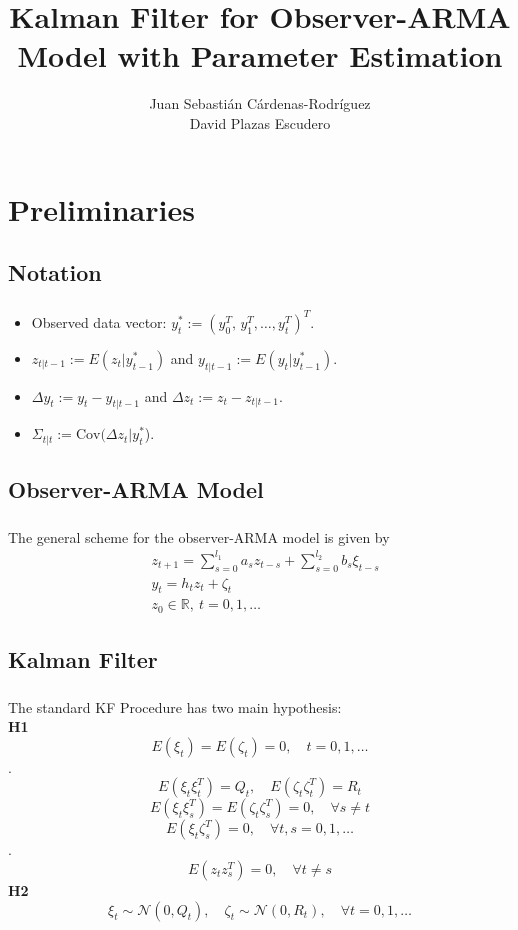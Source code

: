 \documentclass{beamer}
\title{Kalman Filter for Observer-ARMA Model with Parameter Estimation}
\author{Juan Sebasti\'an C\'ardenas-Rodríguez \\ David Plazas Escudero  \\ \vspace{0.5cm} \scalebox{0.7}{Mathematical Engineering, Universidad EAFIT}}
\theoremstyle{definition}
\theoremstyle{remark}
\theoremstyle{example}
\newif\ifinsection
\newif\ifinsubsection
\let\oldsection\section
\renewcommand{\section}{%
  \global\insectiontrue%
  \global\insubsectionfalse%
  \oldsection}
\let\oldsubsection\subsection
\renewcommand{\subsection}{%
  \global\insubsectiontrue%
  \oldsubsection}
\newcommand {\aframe}[1] {%
  \begin{frame}
    \ifinsection\frametitle{\secname}\fi
    \ifinsubsection\framesubtitle{\subsecname}\fi
  #1
  \end{frame}
}
\begin{document}
\begin{frame}[plain]
  \titlepage
\end{frame}

\section{Preliminaries}
\subsection{Notation}
\aframe{
\begin{itemize}
  \item Observed data vector: $y^*_t:=(y_0^T,\,y_1^T,\dots,y_t^T)^T$.
  \item $z_{t|t-1}:=E(z_t|y^*_{t-1})$ and $y_{t|t-1}:=E(y_t|y^*_{t-1})$.
  \item $\Delta y_t:=y_t-y_{t|t-1}$ and $\Delta z_t:=z_t-z_{t|t-1}$.
  \item $\Sigma_{t|t}:=\text{Cov}(\Delta z_t|y_t^*$).
\end{itemize}
}

\subsection{Observer-ARMA Model}
\aframe{
The general scheme for the observer-ARMA model is given by
\begin{equation}
  \begin{split}
    &z_{t+1}=\sum_{s=0}^{l_1}a_sz_{t-s}+\sum_{s=0}^{l_2}b_s\xi_{t-s}\\
    &y_t=h_tz_t+\zeta_t\\
    &z_0\in \mathbb{R}, \ t=0,1,\ldots
  \end{split}
\end{equation}
}

\subsection{Kalman Filter}
\aframe{
  The standard KF Procedure \parencite{kalman1960new} has two main hypothesis:\\
  \textbf{H1}
  \[E(\xi_t)=E(\zeta_t)=0, \quad t=0,1,\ldots\].
  \[E(\xi_t\xi_t^T)=Q_t, \quad E(\zeta_t\zeta_t^T)=R_t\]
  \[E(\xi_t\xi_s^T)=E(\zeta_t\zeta_s^T)=0,\quad\forall s\neq t\]\[E(\xi_t\zeta_s^T)=0, \quad \forall t,s=0,1,\ldots\].
  \[E(z_tz_s^T)=0,\quad\forall t\neq s\] \pause
  \textbf{H2}
  \[\xi_t\sim\mathcal{N}(0,Q_t),\quad\zeta_t\sim\mathcal{N}(0,R_t),\quad\forall t=0,1,\ldots\]
}
\end{document}
